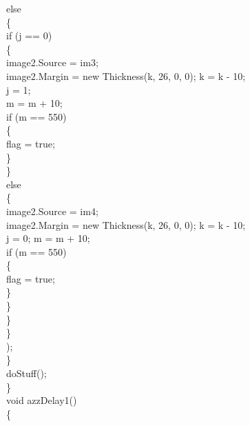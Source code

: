{{                    else\\
                    \{\\
                        if (j == 0)\\
                        \{\\
                            image2.Source = im3;\\
                            image2.Margin = new Thickness(k, 26, 0, 0); k = k - 10;\\
                            j = 1; \\
                            
                                m = m + 10;\\
                                if (m == 550)\\
                                \{\\
                                    flag = true;\\
                                \}\\
                        \}\\
                        else\\
                        \{\\
                            image2.Source = im4;\\
                            image2.Margin = new Thickness(k, 26, 0, 0); k = k - 10;\\
                            j = 0; m = m + 10;\\
                            if (m == 550)\\
                            \{\\
                                flag = true;\\
                            \}\\
                        \}\\
                    \}\\
                   



                \}\\);\\
            \}\\
           doStuff();\\
        \}\\
        
        void azzDelay1()\\
        \{\\

}}
